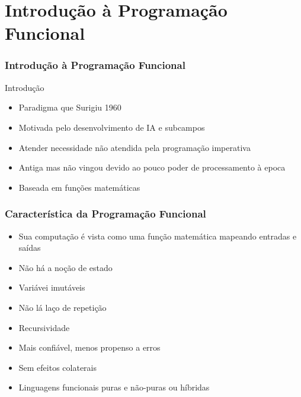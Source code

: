 \def\secUm{Introdução à Programação Funcional}
\section{\secUm}
\begin{frame}
	\frametitle{\secUm}
	Introdução
	\begin{itemize}
		\item Paradigma que Surigiu 1960
		\item Motivada pelo desenvolvimento de IA e subcampos
		\item Atender necessidade não atendida pela programação imperativa
		\item Antiga mas não vingou devido ao pouco poder de processamento à epoca
		\item Baseada em funções matemáticas
	\end{itemize}
\end{frame}




\begin{frame}
	\frametitle{Característica da Programação Funcional}
	\begin{itemize}
		\item Sua computação é vista como uma função matemática mapeando entradas e saídas
		\item Não há a noção de estado
		\item Variávei imutáveis
		\item Não lá laço de repetição
		\item Recursividade
		\item Mais confiável, menos propenso a erros
		\item Sem efeitos colaterais
		\item Linguagens funcionais puras e não-puras ou híbridas
	\end{itemize}
\end{frame}